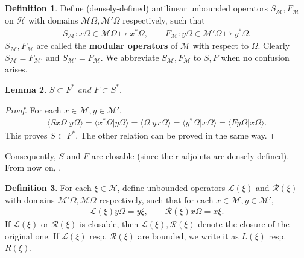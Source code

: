 \documentclass[12pt,b5paper,notitlepage]{article}
\theoremstyle{definition}
\newtheorem{df}{Definition}[section]
\theoremstyle{plain}
\newtheorem{lm}[df]{Lemma}
\newcommand{\mc}{\mathcal}
\newcommand{\bk}[1]{\langle {#1}\rangle}
\newcommand{\scr}{\mathscr}
\numberwithin{equation}{section}
\begin{document}
\subsection{}


\begin{df}
Define (densely-defined) antilinear unbounded operators $S_{\mc M},F_{\mc M}$ on $\mc H$ with domains $\mc M\Omega,\mc M'\Omega$ respectively, such that
\begin{gather*}
S_{\mc M}:x\Omega\in\mc M\Omega\mapsto x^*\Omega,\qquad F_{\mc M}:y\Omega\in\mc M'\Omega\mapsto y^*\Omega.	
\end{gather*}
$S_{\mc M},F_{\mc M}$ are called the \textbf{modular  operators}  of $\mc M$ with respect to $\Omega$. Clearly $S_{\mc M}=F_{\mc M'}$ and $S_{\mc M'}=F_{\mc M}$. We abbreviate $S_{\mc M},F_{\mc M}$ to $S,F$ when no confusion arises.
\end{df}




\begin{lm}
$S\subset F^*$ and $F\subset S^*$.
\end{lm}	




\begin{proof}
For each $x\in\mc M,y\in\mc M'$,
\begin{align*}
\bk{Sx\Omega|y\Omega}=\bk{x^*\Omega|y\Omega}=\bk{\Omega|yx\Omega}=\bk{y^*\Omega|x\Omega}=\bk{Fy\Omega|x\Omega}.	
\end{align*}
This proves $S\subset F^*$. The other relation can be proved in the same way.
\end{proof}

Consequently, $S$ and $F$ are closable (since their adjoints are densely defined). From now on, .

\begin{df}\label{lb92}
For each $\xi\in\mc H$, define unbounded operators $\scr L(\xi)$ and $\scr R(\xi)$ with domains $\mc M'\Omega,\mc M\Omega$ respectively, such that for each $x\in\mc M,y\in\mc M'$,
\begin{align*}
\scr L(\xi)y\Omega=y\xi,\qquad \scr R(\xi)x\Omega=x\xi.	
\end{align*}
If $\scr L(\xi)$ or $\scr R(\xi)$ is closable, then $\scr L(\xi),\scr R(\xi)$ denote the closure of the original one. If $\scr L(\xi)$ resp. $\scr R(\xi)$ are bounded, we write it as $L(\xi)$ resp. $R(\xi)$. \index{LR@$\scr L(\xi),\scr R(\xi),L(\xi),R(\xi)$}
\end{df}
\end{document}
